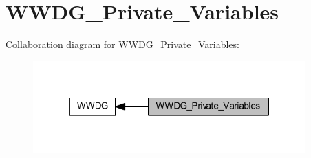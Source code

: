 \hypertarget{group___w_w_d_g___private___variables}{}\section{W\+W\+D\+G\+\_\+\+Private\+\_\+\+Variables}
\label{group___w_w_d_g___private___variables}
Collaboration diagram for W\+W\+D\+G\+\_\+\+Private\+\_\+\+Variables\+:
\nopagebreak
\begin{figure}[H]
\begin{center}
\leavevmode
\includegraphics[width=297pt]{group___w_w_d_g___private___variables}
\end{center}
\end{figure}
